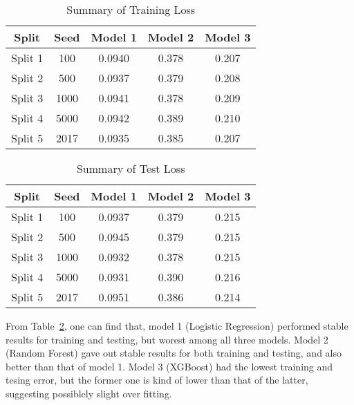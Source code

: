 \documentclass[12pt]{article}
\begin{document}
\begin{table}[htb]
 \caption{Summary of Training Loss} \label{result}
 \vspace{0.1in}
\begin{center}
  \begin{tabular}{  c  c  c  c  c}
    \hline
    Split            & Seed        & Model 1    & Model 2    & Model 3 \\ \hline
    Split 1         & 100    &0.0940    &0.378    &0.207\\ \hline
    Split 2         & 500    &0.0937    &0.379    &0.208\\ \hline
    Split 3         & 1000    &0.0941    &0.378    &0.209\\ \hline
    Split 4         & 5000    &0.0942    &0.389    &0.210\\ \hline
    Split 5         & 2017    &0.0935    &0.385    &0.207\\ \hline
  \end{tabular}
\end{center}
\end{table}
\begin{table}[htb]
 \caption{Summary of Test Loss} \label{result}
 \vspace{0.1in}
\begin{center}
  \begin{tabular}{  c  c  c  c  c}
    \hline
    Split            & Seed        & Model 1    & Model 2    & Model 3 \\ \hline
    Split 1         & 100    &0.0937    &0.379    &0.215\\ \hline
    Split 2         & 500    &0.0945    &0.379    &0.215\\ \hline
    Split 3         & 1000    &0.0932    &0.378    &0.215\\ \hline
    Split 4         & 5000    &0.0931    &0.390    &0.216\\ \hline
    Split 5         & 2017    &0.0951    &0.386    &0.214\\ \hline
  \end{tabular}
\end{center}
\end{table}


From Table~\ref{result}, one can find that, model 1 (Logistic Regression) performed stable results for training and testing, but worest among all three models. Model 2 (Random Forest) gave out stable results for both training and testing, and also better than that of model 1. Model 3 (XGBoost) had the lowest training and tesing error, but the former one is kind of lower than that of the latter, suggesting possiblely slight over fitting.
\end{document}
